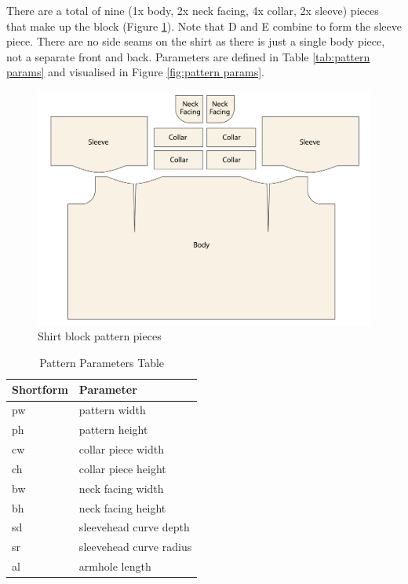 There are a total of nine (1x body, 2x neck facing, 4x collar, 2x sleeve) pieces that make up the block (Figure \ref{fig:original pattern pieces}). Note that D and E combine to form the sleeve piece. There are no side seams on the shirt as there is just a single body piece, not a separate front and back. Parameters are defined in Table \ref{tab:pattern params} and visualised in Figure \ref{fig:pattern params}.
\begin{figure} [H] 
    \centering 
    \includegraphics[width = \textwidth]{Images/originalpattern_pieces.png} 
    \caption{Shirt block pattern pieces}
    \label{fig:original pattern pieces}
\end{figure}
\begin{table}[H]
    \centering
    \captionsetup{font=small}
    \begin{tabular}{
        >{\centering\arraybackslash}p{2cm} | 
        >{\arraybackslash}p{5cm}
    }
        \toprule
        \textbf{Shortform} & \textbf{Parameter} \\
        \midrule
        pw & pattern width \\
        ph & pattern height \\
        cw & collar piece width \\
        ch & collar piece height \\
        bw & neck facing width \\
        bh & neck facing height \\
        sd & sleevehead curve depth \\
        sr & sleevehead curve radius \\
        al & armhole length \\
        \bottomrule
    \end{tabular}
    \caption{Pattern Parameters Table}
    \label{tab:pattern_params}
\end{table}

